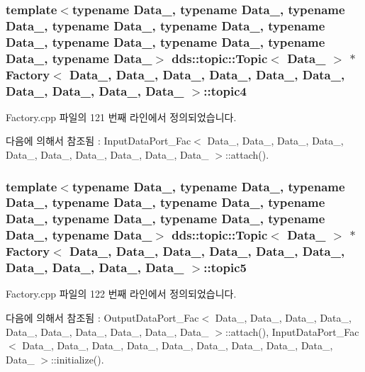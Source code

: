 \subsubsection[{\texorpdfstring{topic4}{topic4}}]{\setlength{\rightskip}{0pt plus 5cm}template$<$typename Data\+\_, typename Data\+\_, typename Data\+\_, typename Data\+\_, typename Data\+\_, typename Data\+\_, typename Data\+\_, typename Data\+\_, typename Data\+\_, typename Data\+\_$>$ dds\+::topic\+::\+Topic$<$ Data\+\_ $>$ $\ast$ {\bf Factory}$<$ Data\+\_, Data\+\_, Data\+\_, Data\+\_, Data\+\_, Data\+\_, Data\+\_, Data\+\_, Data\+\_, Data\+\_ $>$\+::topic4}\hypertarget{classFactory_a9621c03dc6ffd5d7c1b73c66f37cae7c}{}\label{classFactory_a9621c03dc6ffd5d7c1b73c66f37cae7c}


Factory.\+cpp 파일의 121 번째 라인에서 정의되었습니다.



다음에 의해서 참조됨 \+:  Input\+Data\+Port\+\_\+\+Fac$<$ Data\+\_, Data\+\_, Data\+\_, Data\+\_, Data\+\_, Data\+\_, Data\+\_, Data\+\_, Data\+\_, Data\+\_ $>$\+::attach().

\subsubsection[{\texorpdfstring{topic5}{topic5}}]{\setlength{\rightskip}{0pt plus 5cm}template$<$typename Data\+\_, typename Data\+\_, typename Data\+\_, typename Data\+\_, typename Data\+\_, typename Data\+\_, typename Data\+\_, typename Data\+\_, typename Data\+\_, typename Data\+\_$>$ dds\+::topic\+::\+Topic$<$ Data\+\_ $>$ $\ast$ {\bf Factory}$<$ Data\+\_, Data\+\_, Data\+\_, Data\+\_, Data\+\_, Data\+\_, Data\+\_, Data\+\_, Data\+\_, Data\+\_ $>$\+::topic5}\hypertarget{classFactory_a81ba9f3ce496974146df61fb932a64e1}{}\label{classFactory_a81ba9f3ce496974146df61fb932a64e1}


Factory.\+cpp 파일의 122 번째 라인에서 정의되었습니다.



다음에 의해서 참조됨 \+:  Output\+Data\+Port\+\_\+\+Fac$<$ Data\+\_, Data\+\_, Data\+\_, Data\+\_, Data\+\_, Data\+\_, Data\+\_, Data\+\_, Data\+\_, Data\+\_ $>$\+::attach(), Input\+Data\+Port\+\_\+\+Fac$<$ Data\+\_, Data\+\_, Data\+\_, Data\+\_, Data\+\_, Data\+\_, Data\+\_, Data\+\_, Data\+\_, Data\+\_ $>$\+::initialize().

